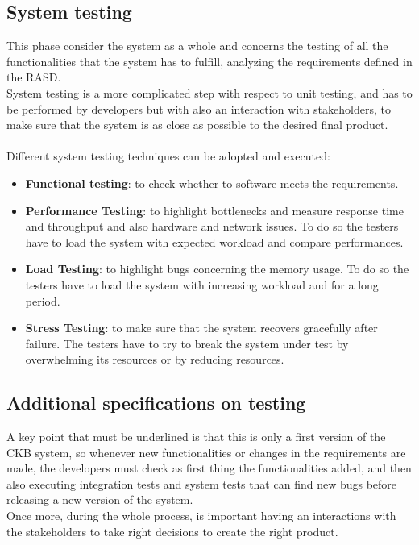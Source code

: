\subsection{System testing}
\vspace{0.5cm}
This phase consider the system as a whole and concerns the testing of all the functionalities that the system has to fulfill, analyzing the requirements defined in the RASD. 
\\System testing is a more complicated step with respect to unit testing, and has to be performed by developers but with also an interaction with stakeholders, to make sure that the system is as close as possible to the desired final product.
\\
\\Different system testing techniques can be adopted and executed:
\begin{itemize}
    \item \textbf{Functional testing}: to check whether to software meets the requirements.
    \item \textbf{Performance Testing}: to highlight bottlenecks and measure response time and throughput and also hardware and network issues. To do so the testers have to load the system with expected workload and compare performances.
    \item \textbf{Load Testing}: to highlight bugs concerning the memory usage. To do so the testers have to load the system with increasing workload and for a long period.
    \item \textbf{Stress Testing}: to make sure that the system recovers gracefully after failure. The testers have to try to break the system under test by overwhelming its resources or by reducing resources.
\end{itemize}

\vspace{1cm}

\subsection{Additional specifications on testing}
A key point that must be underlined is that this is only a first version of the CKB system, so whenever new functionalities or changes in the requirements are made, the developers must check as first thing the functionalities added, and then also executing integration tests and system tests that can find new bugs before releasing a new version of the system. 
\\Once more, during the whole process, is important having an interactions with the stakeholders to take right decisions to create the right product.
